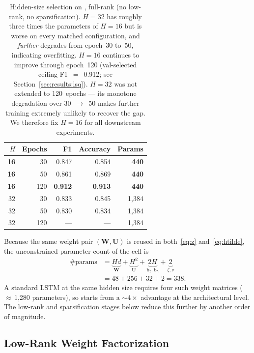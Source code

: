 \begin{table}[h]
\centering
\caption{Hidden-size selection on \hapt{}, full-rank \fastgrnn{}
(no low-rank, no sparsification). $H{=}32$ has roughly three times
the parameters of $H{=}16$ but is worse on every matched
configuration, and \emph{further} degrades from epoch~30 to~50,
indicating overfitting. $H{=}16$ continues to improve through
epoch~120 (val-selected ceiling F1~$=$~0.912; see
Section~\ref{sec:results:lsq}). $H{=}32$ was not extended to
120~epochs --- its monotone degradation over 30~$\rightarrow$~50
makes further training extremely unlikely to recover the gap.
We therefore fix $H{=}16$ for all downstream experiments.}
\label{tab:hsize}
\begin{tabular}{rrrrr}
\toprule
$H$ & Epochs & F1 & Accuracy & Params \\
\midrule
\textbf{16} & 30  & 0.847          & 0.854          & \textbf{440}   \\
\textbf{16} & 50  & 0.861          & 0.869          & \textbf{440}   \\
\textbf{16} & 120 & \textbf{0.912} & \textbf{0.913} & \textbf{440}   \\
32          & 30  & 0.833          & 0.845          & 1{,}384         \\
32          & 50  & 0.830          & 0.834          & 1{,}384         \\
32          & 120 & ---            & ---            & 1{,}384         \\
\bottomrule
\end{tabular}
\end{table}

Because the same weight pair $(\mathbf{W}, \mathbf{U})$ is reused in
both~\eqref{eq:z} and~\eqref{eq:htilde}, the unconstrained
parameter count of the cell is
\begin{align}
\#\text{params}
 &= \underbrace{Hd}_{\mathbf{W}} +
    \underbrace{H^2}_{\mathbf{U}} +
    \underbrace{2H}_{\mathbf{b}_z,\mathbf{b}_h} +
    \underbrace{2}_{\zeta,\nu} \nonumber\\
 &= 48 + 256 + 32 + 2 = 338.
\end{align}
A standard LSTM at the same hidden size requires four such
weight matrices ($\approx$\,1{,}280 parameters), so \fastgrnn{}
starts from a $\sim$$4\times$ advantage at the architectural level.
The low-rank and sparsification stages below reduce this further
by another order of magnitude.

\subsection{Low-Rank Weight Factorization}
\label{sec:method:lowrank}

